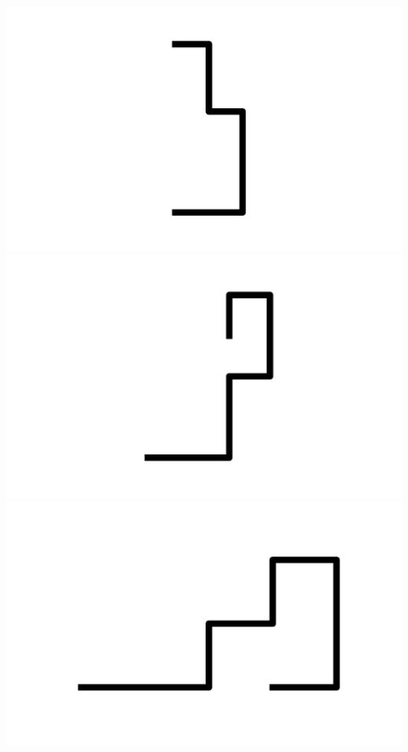 \documentclass[]{report}
\begin{document}
\includegraphics[scale=.1]{pictures/21/state_cluster_shapes_463.pdf} 
\includegraphics[scale=.1]{pictures/21/state_cluster_shapes_464.pdf} 
\includegraphics[scale=.1]{pictures/21/state_cluster_shapes_465.pdf} 
\end{document}
